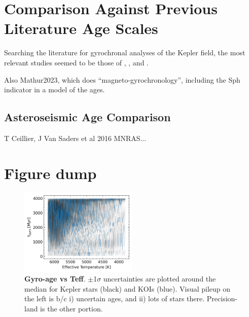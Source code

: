 \documentclass[11pt,twocolumn,tighten]{aastex63}
\begin{document}
\section{Comparison Against Previous Literature Age Scales}
Searching the literature for gyrochronal analyses of the Kepler field,
the most relevant studies seemed to be those of
\citet{Walkowicz_2013}, \citet{Reinhold_2015}, and 
\citet{David_2021}.

Also Mathur2023, which does ``magneto-gyrochronology'', including the
Sph indicator in a model of the ages.


\subsection{Asteroseismic Age Comparison}
T Ceillier, J Van Saders et al 2016 MNRAS...



\section{Figure dump}

\begin{figure}[!t]
  \begin{center}
    \leavevmode
    \includegraphics[width=0.5\textwidth]{gyroage_vs_teff_errs_showplanets_linear.png}
  \end{center}
  \vspace{-0.6cm}
  \caption{
    {\bf Gyro-age vs Teff}.
    $\pm$1$\sigma$ uncertainties are plotted around the median for Kepler stars (black) and KOIs (blue).
    Visual pileup on the left is b/c i) uncertain ages, and ii) lots of stars there.  Precision-land is the other portion.
    \label{fig:gyroage_vs_teff}
  }
\end{figure}

\clearpage
\listofchanges
\end{document}

